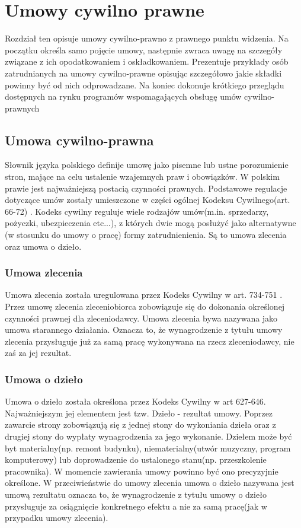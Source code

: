\chapter{Umowy cywilno prawne}
Rozdział ten opisuje umowy cywilno-prawno z prawnego punktu widzenia. Na początku określa samo pojęcie umowy, następnie zwraca uwagę na szczegóły związane z ich opodatkowaniem i oskładkowaniem. Prezentuje przykłady osób zatrudnianych na umowy cywilno-prawne opisując szczegółowo jakie składki powinny być od nich odprowadzane. Na koniec dokonuje krótkiego przeglądu dostępnych na rynku programów wspomagających obsługę umów cywilno-prawnych

\section[Umowa cywilno-prawna][Umowa cywilno-prawna]{Umowa cywilno-prawna}
Słownik języka polskiego \cite{TODO} definije umowę jako pisemne lub ustne porozumienie stron, mające na celu ustalenie wzajemnych praw i obowiązków. W polskim prawie jest najważniejszą postacią czynności prawnych. Podstawowe regulacje dotyczące umów zostały umieszczone w części ogólnej Kodeksu Cywilnego(art. 66-72) \cite{TODO}. Kodeks cywilny reguluje wiele rodzajów umów(m.in. sprzedarzy, pożyczki, ubezpieczenia etc...), z których dwie mogą posłużyć jako alternatywne (w stosunku do umowy o pracę) formy zatrudnienienia. Są to umowa zlecenia oraz umowa o dzieło.

\subsection[Umowa zlecenia][Umowa zlecenia]{Umowa zlecenia}
Umowa zlecenia została uregulowana przez Kodeks Cywilny w art. 734-751 \cite{TODO}. Przez umowę zlecenia zleceniobiorca zobowiązuje się do dokonania określonej czynności prawnej dla zleceniodawcy. Umowa zlecenia bywa nazywana jako umowa starannego działania. Oznacza to, że wynagrodzenie z tytułu umowy zlecenia przysługuje już za samą pracę wykonywana na rzecz zleceniodawcy, nie zaś za jej rezultat.

\subsection[Umowa o dzieło][Umowa o dzieło]{Umowa o dzieło}
Umowa o dzieło została określona przez Kodeks Cywilny w art 627-646\cite{TODO}. Najważniejszym jej elementem jest tzw. Dzieło - rezultat umowy. Poprzez zawarcie strony zobowiązują się z jednej stony do wykoniania dzieła oraz z drugiej stony do wypłaty wynagrodzenia za jego wykonanie. Dziełem może być byt materialny(np. remont budynku), niematerialny(utwór muzyczny, program komputerowy) lub doprowadzenie do ustalonego stanu(np. przeszkolenie pracownika). W momencie zawierania umowy powinno być ono precyzyjnie określone. W przeciwieństwie do umowy zlecenia umowa o dzieło nazywana jest umową rezultatu oznacza to, że wynagrodzenie z tytułu umowy o dzieło przysługuje za osiągnięcie konkretnego efektu a nie za samą pracę(jak w przypadku umowy zlecenia).

